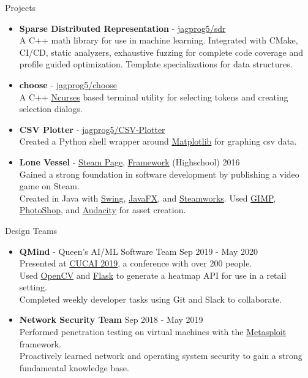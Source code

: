 \documentclass{resume} %
\begin{document}
\begin{rSection}{Projects}
\begin{itemize}
    \item {\bf Sparse Distributed Representation} - \href{https://github.com/jagprog5/SDR/}{jagprog5/sdr}\\
    A C++ math library for use in machine learning. Integrated with CMake, CI/CD, static analyzers, exhaustive fuzzing for complete code coverage and profile guided optimization. Template specializations for data structures.
    \item {\bf choose} - \href{https://github.com/jagprog5/choose/}{jagprog5/choose}\\
    A C++ \href{https://en.wikipedia.org/wiki/Ncurses}{Ncurses} based terminal utility for selecting tokens and creating selection dialogs.
    \item {\bf CSV Plotter} - \href{https://github.com/jagprog5/CSV-Plotter}{jagprog5/CSV-Plotter}\\
    Created a Python shell wrapper around \href{https://matplotlib.org/}{Matplotlib} for graphing csv data. 
    \item {\bf Lone Vessel} - \href{https://store.steampowered.com/app/687420/Lone_Vessel/}{Steam Page}, \href{https://www.youtube.com/watch?v=X63V_5YDLC0}{Framework}
    \hfill {(Highschool) 2016}\\
    Gained a strong foundation in software development by publishing a video game on Steam.\\
    Created in Java with \href{https://www.javatpoint.com/java-swing}{Swing}, \href{https://openjfx.io/}{JavaFX}, and \href{https://partner.steamgames.com/doc/api}{Steamworks}.
    Used \href{https://www.gimp.org/}{GIMP}, \href{https://www.adobe.com/ca/products/photoshop.html}{PhotoShop}, and \href{https://www.audacityteam.org/}{Audacity} for asset creation. 
\end{itemize}

\begin{rSection}{Design Teams}
\begin{itemize}
    \item {\bf QMind} - Queen's AI/ML Software Team \hfill {Sep 2019 - May 2020}\\
    Presented at \href{https://medium.com/qmind-ai/cucai2019-c9d5f848f5c}{CUCAI 2019}, a conference with over 200 people.\\
    Used \href{https://opencv.org/}{OpenCV} and \href{https://flask.palletsprojects.com/en/2.2.x/}{Flask} to generate a heatmap API for use in a retail setting.\\
    Completed weekly developer tasks using Git and Slack to collaborate.
    \item {\bf Network Security Team} \hfill {Sep 2018 - May 2019}\\
    Performed penetration testing on virtual machines with the \href{https://www.metasploit.com/}{Metasploit} framework.\\
    Proactively learned network and operating system security to gain a strong fundamental knowledge base.
\end{itemize}
\end{rSection}

\end{rSection}
\end{document}
